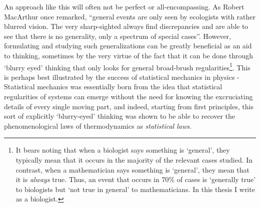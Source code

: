 An approach like this will often not be perfect or all-encompassing. As Robert MacArthur once remarked, ``general events are only seen by ecologists with rather blurred vision. The very sharp-sighted always find discrepancies and are able to see that there is no generality, only a spectrum of special cases”\citep{kingsland_modeling_1985}. However, formulating and studying such generalizations can be greatly beneficial as an aid to thinking, sometimes by the very virtue of the fact that it can be done through `blurry eyed' thinking that only looks for general broad-brush regularities\footnote{It bears noting that when a biologist says something is `general', they typically mean that it occurs in the majority of the relevant cases studied. In contrast, when a mathematician says something is `general', they mean that it is \emph{always} true. Thus, an event that occurs in 70\% of cases is `generally true' to biologists but `not true in general' to mathematicians. In this thesis I write as a biologist.}. This is perhaps best illustrated by the success of statistical mechanics in physics - Statistical mechanics was essentially born from the idea that statistical regularities of systems can emerge without the need for knowing the excruciating details of every single moving part, and indeed, starting from first principles, this sort of explicitly `blurry-eyed' thinking was shown to be able to recover the phenomenological laws of thermodynamics as \emph{statistical laws}.

